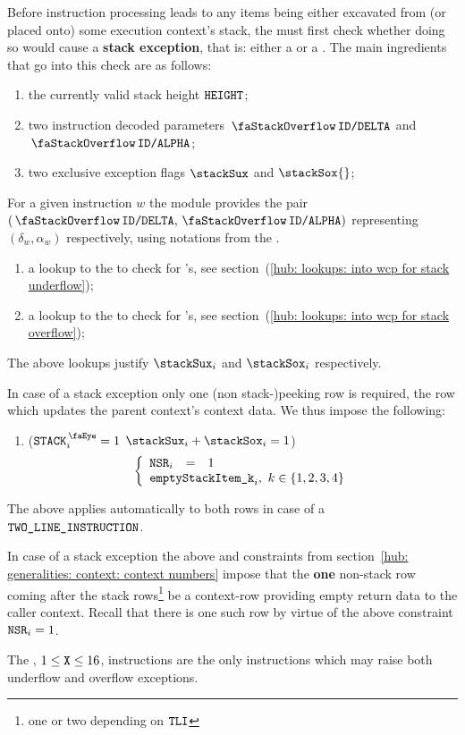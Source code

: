\begin{center}
\end{center}

Before instruction processing leads to any items being either excavated from (or placed onto) some execution context's stack, the \zkEvm{} must first check whether doing so would cause a \textbf{stack exception}, that is: either a \suxSH{} or a \soxSH{}.
The main ingredients that go into this check are as follows:
\begin{enumerate}
	\item the currently valid stack height $\texttt{HEIGHT}$;
	\item two instruction decoded parameters $\stackDelta$ and $\stackAlpha$;
	\item two exclusive exception flags $\stackSux$ and $\stackSox{}$;
\end{enumerate}
\saNote{} For a given instruction $w$ the \idMod{} module provides the pair $(\stackDelta, \stackAlpha)$ representing $(\delta_{w},\alpha_{w})$ respectively, using notations from the \cite{EYP-London}.
\begin{enumerate}[resume]
	\item a lookup to the \wcpMod{} to check for \suxSH{}'s, see section~(\ref{hub: lookups: into wcp for stack underflow});
	\item a lookup to the \wcpMod{} to check for \soxSH{}'s, see section~(\ref{hub: lookups: into wcp for stack overflow});
\end{enumerate}
\saNote{} The above lookups justify $\stackSux_{i}$ and $\stackSox_{i}$ respectively.

In case of a stack exception only one (non stack-)peeking row is required, the row which updates the parent context's context data.
We thus impose the following:
\begin{enumerate}
	\item \If \Big($\peekStack_{i} = 1$ \et $\stackSux_{i} + \stackSox_{i} = 1$\Big) \Then
		\[
			\left\{ \begin{array}{lcl}
				\nonStackRows_{i} & = & 1 \\
				\multicolumn{3}{l}{\emptyStackItem{k}_{i}, ~ k\in\{1,2,3,4\}} \\
			\end{array} \right.
		\]
\end{enumerate}
\saNote{} The above applies automatically to both rows in case of a $\texttt{TWO\_LINE\_INSTRUCTION}{}$.

\saNote{} In case of a stack exception the above and constraints from section~\ref{hub: generalities: context: context numbers} impose that the \textbf{one} non-stack row coming after the stack rows\footnote{one or two depending on $\texttt{TLI}{}$} be a context-row providing empty return data to the caller context. Recall that there is one such row by virtue of the above constraint $\texttt{NSR}_{i} = 1$.

\saNote{} The , $1 \leq \texttt{X} \leq 16$, instructions are the only instructions which may raise both underflow and overflow exceptions.
